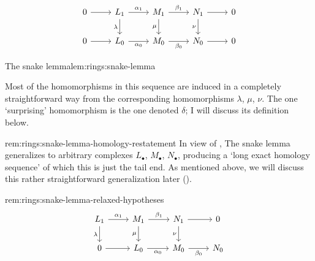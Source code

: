 \[\begin{tikzcd}
    0 \arrow[r] & L_1 \arrow[r, "\alpha_1"] \arrow[d, "\lambda"'] & M_1 \arrow[r, "\beta_1"] \arrow[d, "\mu"'] & N_1 \arrow[r] \arrow[d, "\nu"'] & 0 \\
    0 \arrow[r] & L_0 \arrow[r, "\alpha_0"'] & M_0 \arrow[r,
    "\beta_0"'] & N_0 \arrow[r] & 0
  \end{tikzcd}\]
\begin{lem}{The snake lemma}{lem:rings:snake-lemma}
\end{lem}
\begin{rem}{}{}
  Most of the homomorphisms in this sequence are induced in a
  completely straightforward way from the corresponding homomorphisms
  $\lambda$, $\mu$, $\nu$. The one `surprising' homomorphism is the
  one denoted $\delta$; I will discuss its definition below.
\end{rem}
\begin{rem}{}{rem:rings:snake-lemma-homology-restatement}
  In view of ,  The snake lemma
  generalizes to arbitrary complexes $L_\bullet$, $M_\bullet$,
  $N_\bullet$, producing a `long exact homology sequence' of which
  this is just the tail end. As mentioned above, we will discuss this
  rather straightforward generalization later
  ().
\end{rem}
\begin{rem}{}{rem:rings:snake-lemma-relaxed-hypotheses}
  \[\begin{tikzcd}
      L_1 \arrow[r, "\alpha_1"] \arrow[d, "\lambda"'] & M_1 \arrow[r, "\beta_1"] \arrow[d, "\mu"'] & N_1 \arrow[r] \arrow[d, "\nu"'] & 0 \\
      0 \arrow[r] & L_0 \arrow[r, "\alpha_0"'] & M_0 \arrow[r,
      "\beta_0"'] & N_0
    \end{tikzcd}\]
\end{rem}
